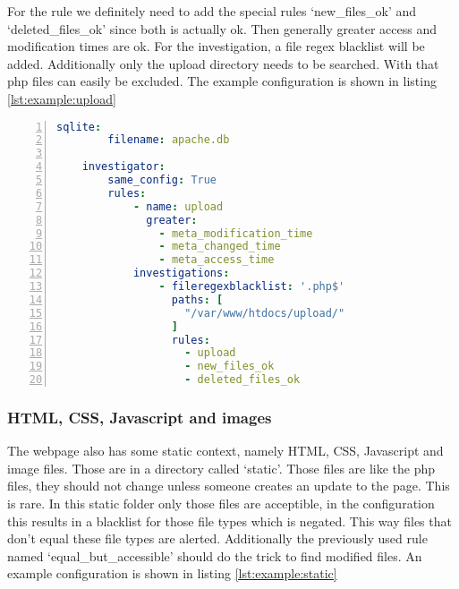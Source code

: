 For the rule we definitely need to add the special rules `new\_files\_ok' and `deleted\_files\_ok' since both is actually ok. Then generally greater access and modification times are ok. For the investigation, a file regex blacklist will be added. Additionally only the upload directory needs to be searched. With that php files can easily be excluded. The example configuration is shown in  listing \ref{lst:example:upload} 

\begin{lstlisting}[language=yaml, numbers=left, caption=Scanner Configuration, label=lst:example:upload]
    sqlite:
        filename: apache.db
    
    investigator:
        same_config: True
        rules: 
            - name: upload
              greater:
                - meta_modification_time
                - meta_changed_time
                - meta_access_time
            investigations:
                - fileregexblacklist: '.php$'
                  paths: [
                    "/var/www/htdocs/upload/"
                  ]
                  rules:
                    - upload
                    - new_files_ok
                    - deleted_files_ok

\end{lstlisting}

\subsubsection{HTML, CSS, Javascript and images}

The webpage also has some static context, namely HTML, CSS, Javascript and image files. Those are in a directory called `static'. Those files are like the php files, they should not change unless someone creates an update to the page. This is rare. In this static folder only those files are acceptible, in the configuration this results in a blacklist for those file types which is negated. This way files that don't equal these file types are alerted. Additionally the previously used rule named `equal\_but\_accessible' should do the trick to find modified files. An example configuration is shown in listing \ref{lst:example:static} 


